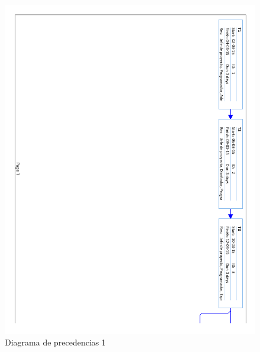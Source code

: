 \begin{figure}[!htbp]
	\centering
	\includegraphics[page=1, scale=.65]{fig/real_network_diagram}
	\caption{Diagrama de precedencias 1}
\end{figure}

